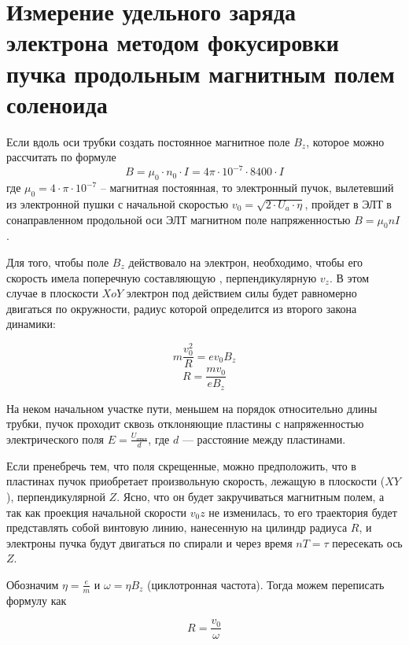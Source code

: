 \section{Измерение удельного заряда электрона методом фокусировки пучка продольным магнитным полем соленоида}

Если вдоль оси трубки создать постоянное магнитное поле $B_z$, которое можно рассчитать по формуле
\begin{equation}
	B=\mu_0\cdot{}n_0\cdot{}I=4\pi\cdot10^{-7}\cdot8400\cdot{}I
\end{equation}
где $\mu_0=4\cdot\pi\cdot10^{-7}$ -- магнитная постоянная, то электронный пучок, вылетевший из электронной пушки с начальной скоростью $v_0=\sqrt{2\cdot{U_a}\cdot\eta}$, пройдет в ЭЛТ в сонаправленном продольной оси ЭЛТ магнитном поле напряженностью $B=\mu_0nI$. 

Для того, чтобы поле $B_z$ действовало на электрон, необходимо, чтобы его скорость имела поперечную составляющую , перпендикулярную $v_z$. В этом случае в плоскости $XoY$ электрон под действием силы  будет равномерно двигаться по окружности, радиус которой определится из второго закона динамики:

\begin{equation}
	m\frac{v_0^2}{R}=ev_0B_z
\end{equation}
\begin{equation}
	R=\frac{mv_0}{eB_z}
\end{equation}

На неком начальном участке пути, меньшем на порядок относительно длины трубки, пучок проходит сквозь отклоняющие пластины с напряженностью электрического поля $E=\frac{U_\text{откл}}{d}$, где $d$ --- расстояние между пластинами.

Если пренебречь тем, что поля скрещенные, можно предположить, что в пластинах пучок приобретает произвольную скорость, лежащую в плоскости ($XY$), перпендикулярной $Z$. Ясно, что он будет закручиваться магнитным полем, а так как проекция начальной скорости $v_0z$ не изменилась, то
его траектория будет представлять собой винтовую линию, нанесенную на цилиндр радиуса $R$, и электроны пучка будут двигаться по спирали и через время $nT=\tau$ пересекать ось $Z$.

Обозначим $\eta=\frac{e}{m}$ и $\omega=\eta{}B_z$ (циклотронная частота). Тогда можем переписать формулу как

\begin{equation}
	R=\frac{v_0}{\omega}
\end{equation}


